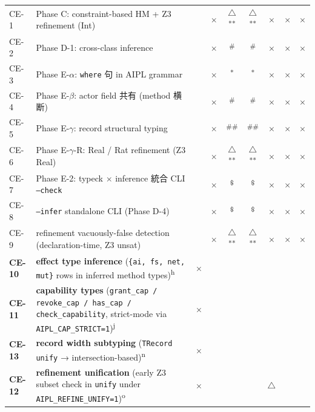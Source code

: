 \documentclass[10pt,a4paper,landscape]{article}
\newcommand{\Yes}{\textcolor{green!50!black}{\textbf{\checkmark}}}
\newcommand{\No}{\textcolor{red!70!black}{$\times$}}
\newcommand{\Part}{\textcolor{orange!80!black}{$\triangle$}}
\begin{document}
\begin{longtable}{l F C C C C C C C}
  CE-1 & Phase C: constraint-based HM + Z3 refinement (Int)      & \Yes & \No & \Part\textsuperscript{**} & \Part\textsuperscript{**} & \No & \No & \No \\
  CE-2 & Phase D-1: cross-class inference                        & \Yes & \No & \Yes\textsuperscript{\#} & \Yes\textsuperscript{\#} & \No & \No & \No \\
  CE-3 & Phase E-$\alpha$: \texttt{where} 句 in AIPL grammar      & \Yes & \No & \Yes\textsuperscript{*} & \Yes\textsuperscript{*} & \No & \No & \No \\
  CE-4 & Phase E-$\beta$: actor field 共有 (method 横断)         & \Yes & \No & \Yes\textsuperscript{\#} & \Yes\textsuperscript{\#} & \No & \No & \No \\
  CE-5 & Phase E-$\gamma$: record structural typing              & \Yes & \No & \Yes\textsuperscript{\#\#} & \Yes\textsuperscript{\#\#} & \No & \No & \No \\
  CE-6 & Phase E-$\gamma$-R: Real / Rat refinement (Z3 Real)     & \Yes & \No & \Part\textsuperscript{**} & \Part\textsuperscript{**} & \No & \No & \No \\
  CE-7 & Phase E-2: typeck $\times$ inference 統合 CLI \texttt{--check} & \Yes & \No & \Yes\textsuperscript{\$} & \Yes\textsuperscript{\$} & \No & \No & \No \\
  CE-8 & \texttt{--infer} standalone CLI (Phase D-4)             & \Yes & \No & \Yes\textsuperscript{\$} & \Yes\textsuperscript{\$} & \No & \No & \No \\
  CE-9 & refinement vacuously-false detection (declaration-time, Z3 unsat) & \Yes & \No & \Part\textsuperscript{**} & \Part\textsuperscript{**} & \No & \No & \No \\
  \textbf{CE-10} & \textbf{effect type inference} (\texttt{\{ai, fs, net, mut\}} rows in inferred method types)\textsuperscript{h} & \No & \textbf{\Yes} & \textbf{\Yes} & \textbf{\Yes} & \textbf{\Yes} & \textbf{\Yes} & \textbf{\Yes} \\
  \textbf{CE-11} & \textbf{capability types} (\texttt{grant\_cap / revoke\_cap / has\_cap / check\_capability}, strict-mode via \texttt{AIPL\_CAP\_STRICT=1})\textsuperscript{j} & \No & \textbf{\Yes} & \textbf{\Yes} & \textbf{\Yes} & \Yes & \Yes & \Yes \\
  \textbf{CE-13} & \textbf{record width subtyping} (\texttt{TRecord} \texttt{unify} → intersection-based)\textsuperscript{n} & \No & \textbf{\Yes} & \textbf{\Yes} & \textbf{\Yes} & \textbf{\Yes} & \textbf{\Yes} & \textbf{\Yes} \\
  \textbf{CE-12} & \textbf{refinement unification} (early Z3 subset check in \texttt{unify} under \texttt{AIPL\_REFINE\_UNIFY=1})\textsuperscript{o} & \No & \textbf{\Yes} & \textbf{\Yes} & \textbf{\Yes} & \Part & \textbf{\Yes} & \textbf{\Yes} \\
  \bottomrule
\end{longtable}
\end{document}

